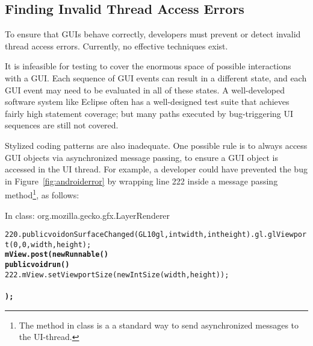 


\subsection{Finding Invalid Thread Access Errors}
\label{sec:finding}

To ensure that GUIs behave correctly, developers must prevent or detect invalid thread
access errors. Currently, no effective techniques exist. %

It is infeasible for testing to cover the enormous space of possible interactions
with a GUI. Each sequence of GUI events can result in
a different state, and each GUI event may need to be evaluated in all of
these states. A well-developed software system like Eclipse
often has a well-designed test suite that achieves fairly high statement coverage;
but many paths executed by bug-triggering UI sequences are still not covered.

Stylized coding patterns are also inadequate. One possible rule is to always
access GUI objects via asynchronized message passing, to ensure a GUI object is accessed in
the UI thread. For example, a developer could have prevented the bug in Figure~\ref{fig:androiderror}
by wrapping line 222 inside a  message passing method\footnote{The
 method in class  is a
a standard way to send asynchronized messages to the UI-thread.}, as follows:

{\vspace{2mm}
\hspace{3mm}\small{In class: org.mozilla.gecko.gfx.LayerRenderer}
\vspace{-2mm}
\begin{CodeOut}
\begin{alltt}
220. public void onSurfaceChanged(GL10 gl, int width, int height) .     gl.glViewport(0, 0, width, height);
         \textbf{mView.post(new Runnable() \ttlcb}
             \textbf{public void run() \ttlcb}
222.             mView.setViewportSize(new IntSize(width, height));
             \textbf{\ttrcb}
         \textbf{\ttrcb);}
     \ttrcb
\end{alltt}
\end{CodeOut}}


